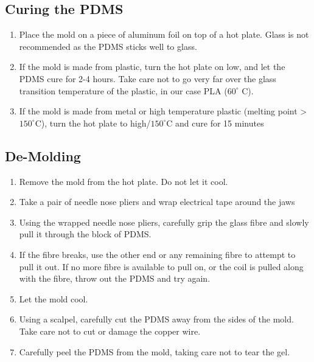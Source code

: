 \documentclass[10pt, journal]{IEEEtran}
\begin{document}
\subsection{Curing the PDMS}

\begin{enumerate}
\item Place the mold on a piece of aluminum foil on top of a hot
  plate. Glass is not recommended as the PDMS sticks well to glass.
\item If the mold is made from plastic, turn the hot plate on low, and
  let the PDMS cure for 2-4 hours. Take care not to go very far over
  the glass transition temperature of the plastic, in our case PLA
  ($60^\circ$ C).
\item If the mold is made from metal or high temperature plastic
  (melting point \textgreater $150^\circ$C), turn the hot plate to
  high/$150^\circ$C and cure for 15 minutes
\end{enumerate}
    
\subsection{De-Molding}
\begin{enumerate}
\item Remove the mold from the hot plate. Do not let it cool.
\item Take a pair of needle nose pliers and wrap electrical tape
    around the jaws
\item Using the wrapped needle nose pliers, carefully grip the glass
  fibre and slowly pull it through the block of PDMS.
\item If the fibre breaks, use the other end or any remaining fibre to
  attempt to pull it out. If no more fibre is available to pull on, or
  the coil is pulled along with the fibre, throw out the PDMS and try
  again.
\item Let the mold cool.
\item Using a scalpel, carefully cut the PDMS away from the sides of the mold. Take care not to cut or damage the copper wire.
\item Carefully peel the PDMS from the mold, taking care not to tear the gel.
\end{enumerate}
\end{document}
